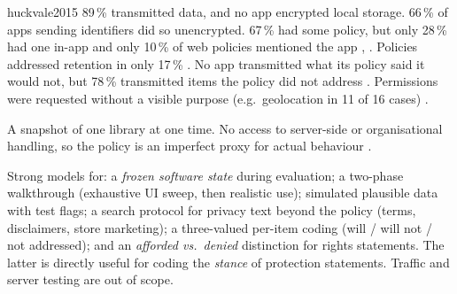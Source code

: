 \begin{papercard}{huckvale2015}
 89\,\% transmitted data, and no app encrypted local storage. 66\,\% of apps sending identifiers did so unencrypted. 67\,\% had some policy, but only 28\,\% had one in-app and only 10\,\% of web policies mentioned the app , . Policies addressed retention in only 17\,\% . No app transmitted what its policy said it would not, but 78\,\% transmitted items the policy did not address . Permissions were requested without a visible purpose (e.g.\ geolocation in 11 of 16 cases) .

 A snapshot of one library at one time. No access to server-side or organisational handling, so the policy is an imperfect proxy for actual behaviour .

 Strong models for: a \emph{frozen software state} during evaluation; a two-phase walkthrough (exhaustive UI sweep, then realistic use); simulated plausible data with test flags; a search protocol for privacy text beyond the policy (terms, disclaimers, store marketing); a three-valued per-item coding (will / will not / not addressed); and an \emph{afforded vs.\ denied} distinction for rights statements. The latter is directly useful for coding the \emph{stance} of protection statements. Traffic and server testing are out of scope.
\end{papercard}


